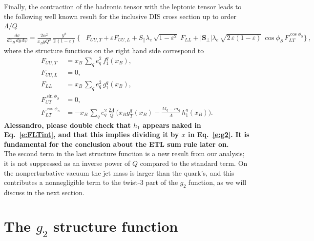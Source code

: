 \documentclass[preprintnumbers,floatfix,nofootinbib]{revtex4}
\newcommand{\todo}[1]{\marginpar{$\bullet$}\textbf{#1}}
\newcommand{\xbj}{{x_B}}                   %
\newcommand{\mj}{M_q}
\newcommand{\mq}{m_q}
\begin{document}
Finally, the contraction of the hadronic tensor with the leptonic tensor leads
to the following well known result for the inclusive DIS cross section up to order $\Lambda/Q$~\cite{Bacchetta:2006tn}
\begin{align}
\frac{d\sigma}{d\xbj \, dy\, d\psi}
=
\frac{2 \alpha^2}{\xbj y Q^2}\,
\frac{y^2}{2\,(1-\varepsilon)}\, 
\biggl\{
&F_{UU ,T} + \varepsilon F_{UU ,L}
+ S_\parallel \lambda_e\,
  \sqrt{1-\varepsilon^2}\; 
F_{LL}
+ |\bm{S}_\perp| \lambda_e\, \sqrt{2\,\varepsilon (1-\varepsilon)}\, 
  \cos\phi_S\, 
F_{LT}^{\cos \phi_S}
 \biggr\} \ ,
\label{e:crossdis}
\end{align}
where the structure functions on the right hand side correspond to
\begin{align}
F_{UU ,T} &= \xbj\,\sum_q e_q^2\,f_1^q(\xbj),
\\
F_{UU ,L} &= 0,
\\
F_{LL} &=\xbj\,\sum_q e_q^2\,g_1^q(\xbj),
\\
F_{UT}^{\sin \phi_S}&=0,
\label{e:FUTint}
\\
F_{LT}^{\cos \phi_S}&=-\xbj\,\sum_q e_q^2\, \frac{2\Lambda}{Q}\,
\biggl(\xbj  g_T^q(\xbj)
   + \frac{\mj -\mq}{\Lambda} \, h_{1}^q(\xbj) \biggr).
\label{e:FLTint}
\end{align}
\todo{Alessandro, please double check that $h_1$ appears naked in Eq.~\eqref{e:FLTint}, and that this implies dividing it by $x$ in Eq.~\eqref{e:g2}. It is fundamental for the conclusion about the ETL sum rule later on.\\}
The second term in the last structure function is a new result from our
analysis; it is not suppressed as an inverse power of $Q$ compared to the
standard term. On the nonperturbative
vacuum the jet mass is larger than the quark's, and this contributes a
nonnegligible term to the twist-3 part of the $g_2$ function, as we will
discuss in the next section.  

 

\section{The $g_2$ structure function}
\end{document}
